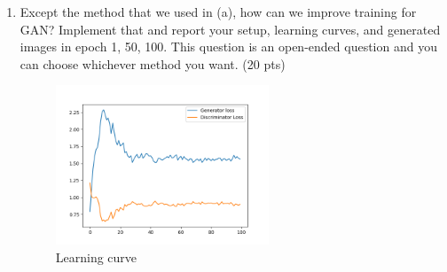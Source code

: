 \documentclass[a4paper]{article}
\theoremstyle{definition}
\begin{document}
\begin{enumerate} [label=(\alph*)]
		\item Except the method that we used in (a), how can we improve training for GAN? Implement that and report your setup, learning curves, and generated images in epoch 1, 50, 100.
        This question is an open-ended question and you can choose whichever method you want.
		\hfill (20 pts)
		

		\begin{figure}[H]
			\centering
			\includegraphics[width=0.6\textwidth]{gan_q1c_loss.png}
			\caption{Learning curve}
			\label{fig:gan_q1c_loss}
		\end{figure}
		

\end{enumerate}
\end{document}
